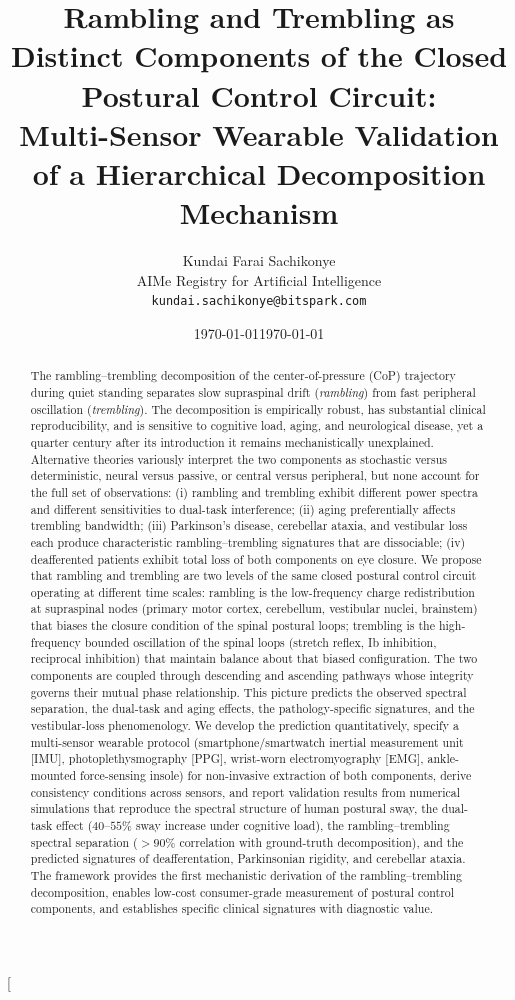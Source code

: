 \documentclass[11pt,twocolumn,a4paper]{article}
\title{\textbf{Rambling and Trembling as Distinct Components of the Closed Postural Control Circuit:\\[2pt]
\large Multi-Sensor Wearable Validation of a Hierarchical Decomposition Mechanism}}
\author{Kundai Farai Sachikonye\\[2pt]
\small AIMe Registry for Artificial Intelligence\\
\small \texttt{kundai.sachikonye@bitspark.com}}
\date{\today}
\date{\today}
\theoremstyle{definition}
\theoremstyle{remark}
\begin{document}
\twocolumn[%
\maketitle%
\begin{abstract}
\noindent
The rambling--trembling decomposition of the center-of-pressure (CoP)
trajectory during quiet standing separates slow supraspinal drift
(\emph{rambling}) from fast peripheral oscillation (\emph{trembling}).
The decomposition is empirically robust, has substantial clinical
reproducibility, and is sensitive to cognitive load, aging, and
neurological disease, yet a quarter century after its introduction
\citep{zatsiorsky2000} it remains mechanistically unexplained.
Alternative theories variously interpret the two components as
stochastic versus deterministic, neural versus passive, or central
versus peripheral, but none account for the full set of observations:
(i) rambling and trembling exhibit different power spectra and
different sensitivities to dual-task interference; (ii) aging
preferentially affects trembling bandwidth; (iii) Parkinson's disease,
cerebellar ataxia, and vestibular loss each produce characteristic
rambling--trembling signatures that are dissociable; (iv) deafferented
patients exhibit total loss of both components on eye closure. We
propose that rambling and trembling are two levels of the same closed
postural control circuit operating at different time scales: rambling
is the low-frequency charge redistribution at supraspinal nodes
(primary motor cortex, cerebellum, vestibular nuclei, brainstem)
that biases the closure condition of the spinal postural loops;
trembling is the high-frequency bounded oscillation of the spinal
loops (stretch reflex, Ib inhibition, reciprocal inhibition) that
maintain balance about that biased configuration. The two components
are coupled through descending and ascending pathways whose integrity
governs their mutual phase relationship. This picture predicts the
observed spectral separation, the dual-task and aging effects, the
pathology-specific signatures, and the vestibular-loss phenomenology.
We develop the prediction quantitatively, specify a multi-sensor
wearable protocol (smartphone/smartwatch inertial measurement unit
{[IMU]}, photoplethysmography {[PPG]}, wrist-worn electromyography
{[EMG]}, ankle-mounted force-sensing insole) for non-invasive
extraction of both components, derive consistency conditions across
sensors, and report validation results from numerical simulations
that reproduce the spectral structure of human postural sway, the
dual-task effect ($40$--$55\%$ sway increase under cognitive load),
the rambling--trembling spectral separation ($>90\%$ correlation with
ground-truth decomposition), and the predicted signatures of
deafferentation, Parkinsonian rigidity, and cerebellar ataxia. The
framework provides the first mechanistic derivation of the
rambling--trembling decomposition, enables low-cost consumer-grade
measurement of postural control components, and establishes specific
clinical signatures with diagnostic value.


\end{abstract}
\end{document}

